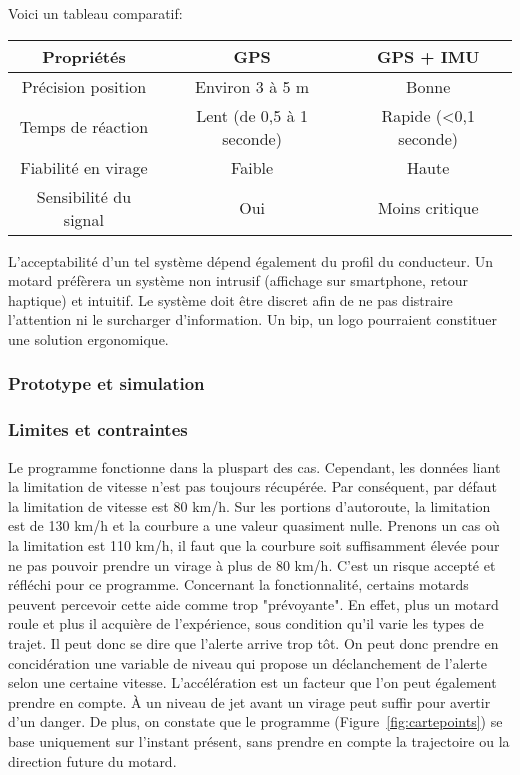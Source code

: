\vspace{0.5cm}
Voici un tableau comparatif:\\
\begin{tabular}{|c|c|c|}
\hline
\textbf{Propriétés} & \textbf{GPS} & \textbf{GPS + IMU} \\
\hline
Précision position & Environ 3 à 5 m & Bonne \\
Temps de réaction & Lent (de 0,5 à 1 seconde) & Rapide (<0,1 seconde)\\
Fiabilité en virage & Faible & Haute \\
Sensibilité du signal & Oui & Moins critique \\
\hline
\end{tabular}

\vspace{0.5cm}
L’acceptabilité d’un tel système dépend également du profil du conducteur. Un motard préfèrera un système non intrusif (affichage sur smartphone, retour haptique) et intuitif. Le système doit être discret afin de ne pas distraire l’attention ni le surcharger d’information. Un bip, un logo pourraient constituer une solution ergonomique.



\subsubsection{Prototype et simulation}

\subsubsection{Limites et contraintes}




Le programme fonctionne dans la pluspart des cas. Cependant, les données liant la limitation de vitesse n'est pas toujours récupérée. Par conséquent, par défaut la limitation de vitesse est 80 km/h. Sur les portions d'autoroute, la limitation est de 130 km/h et la courbure a une valeur quasiment nulle. Prenons un cas où la limitation est 110 km/h, il faut que la courbure soit suffisamment élevée pour ne pas pouvoir prendre un virage à plus de 80 km/h. C'est un risque accepté et réfléchi pour ce programme.
Concernant la fonctionnalité, certains motards peuvent percevoir cette aide comme trop "prévoyante". En effet, plus un motard roule et plus il acquière de l'expérience, sous condition qu'il varie les types de trajet. Il peut donc se dire que l'alerte arrive trop tôt. On peut donc prendre en concidération une variable de niveau qui propose un déclanchement de l'alerte selon une certaine vitesse. L'accélération est un facteur que l'on peut également prendre en compte. À un niveau de jet avant un virage peut suffir pour avertir d'un danger.
De plus, on constate que le programme (Figure~\ref{fig:cartepoints}) se base uniquement sur l’instant présent, sans prendre en compte la trajectoire ou la direction future du motard.



